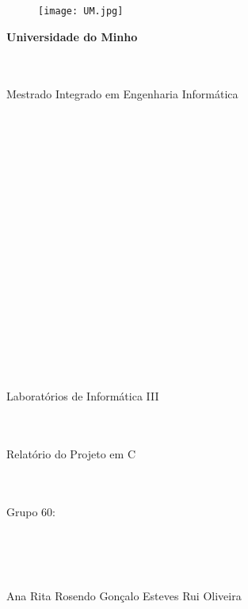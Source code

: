 \documentclass{article}
\begin{document}
\thispagestyle{empty}
\begin{center}

\begin{figure}
\centering
\texttt{[image: UM.jpg]}
\end{figure}

\begin{Huge}
\textbf{Universidade do Minho}
\end{Huge}

\begin{LARGE}
\\ \ \\ 
Mestrado Integrado em Engenharia Informática
\end{LARGE}

\\ \ \\ \ \\ \ \\ \ \\ \ \\ \ \\ \ \\ \ \\ \ \\ \ \\ \ \\ \ \\ \ \\ \ \\ \ \\ \ \\ 
\begin{huge}
Laboratórios de Informática III
\end{huge}

\begin{Large}
\\ \ \\ 
Relatório do Projeto em C
\end{Large} 
\begin{large}
\\ \ \\
Grupo 60:
\end{large} 
\\ \ \\ \ \\
\end{center}


\begin{normalsize}

\begin{multicols}
           Ana Rita Rosendo \hspace{1.3cm} Gonçalo Esteves \hspace{1.7cm} Rui Oliveira
          
\end{multicols}

\end{normalsize}
\end{document}

